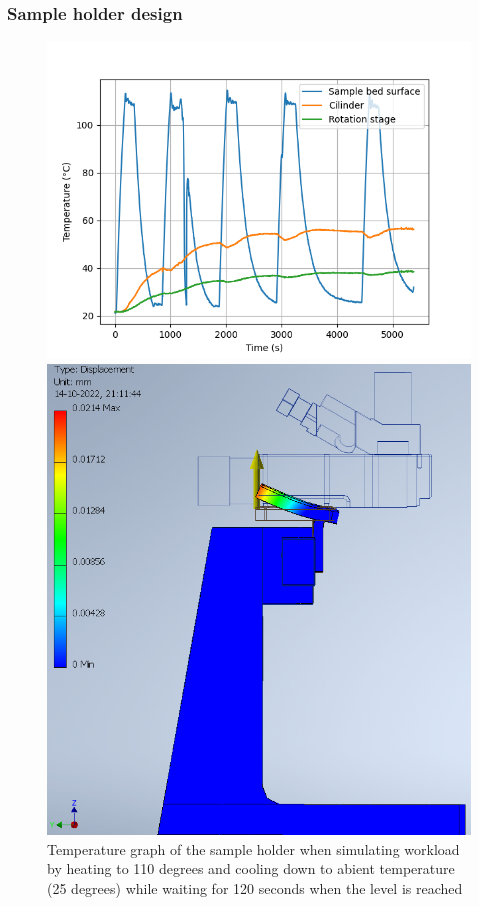 \documentclass[11pt]{article}
\begin{document}
\subsubsection{Sample holder design}

\begin{figure}[H]
  \centering
  \begin{minipage}[b]{0.45\textwidth}
    \includegraphics[width=\textwidth]{img/sample_holder_and_mask/temp_cycling.png}
    \caption{Temperature graph of the sample holder when simulating workload by heating to 110 degrees and cooling down to abient temperature (25 degrees) while waiting for 120 seconds when the level is reached}
    \label{fig:temperature_graph}
  \end{minipage}
  \hfill
  \begin{minipage}[b]{0.45\textwidth}
    \includegraphics[width=1\textwidth]{img/rigidity_simulation/study_8.png}

\end{minipage}
\end{figure}
\end{document}
